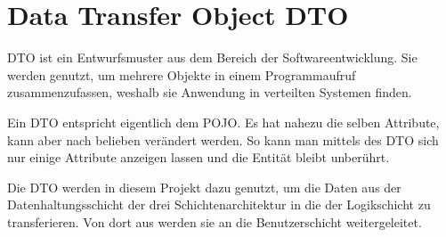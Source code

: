 \section{Data Transfer Object DTO}
\label{sec:dto}
\ac{DTO} ist ein Entwurfsmuster aus dem Bereich der Softwareentwicklung. Sie werden genutzt, um mehrere Objekte in einem Programmaufruf zusammenzufassen, weshalb sie Anwendung in verteilten Systemen finden. 

Ein \ac{DTO} entspricht eigentlich dem POJO. Es hat nahezu die selben Attribute, kann aber nach belieben verändert werden. So kann man mittels des \ac{DTO} sich nur einige Attribute anzeigen lassen und die Entität bleibt unberührt. 

Die \ac{DTO} werden in diesem Projekt dazu genutzt, um die Daten aus der Datenhaltungsschicht der drei Schichtenarchitektur in die der Logikschicht zu transferieren. Von dort aus werden sie an die Benutzerschicht weitergeleitet.  